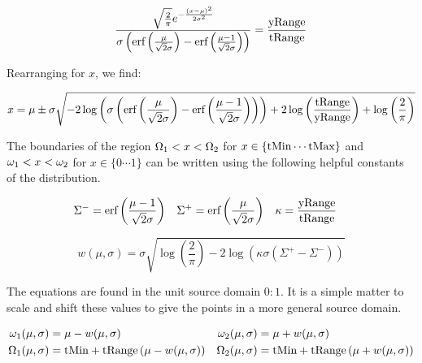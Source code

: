 \begin{equation}\label{eq:Boundaries}
\frac{\sqrt{\frac{2}{\pi }} e^{-\frac{(x-\mu )^2}{2 \sigma ^2}}}{\sigma  \left(\text{erf}\left(\frac{\mu }{\sqrt{2} \sigma }\right)-\text{erf}\left(\frac{\mu -1}{\sqrt{2} \sigma }\right)\right)}=\frac{\text{yRange}}{\text{tRange}}
\end{equation}

Rearranging for $x$, we find:

\begin{equation}\label{eq:PreservedRegion}
 x=\mu \pm \sigma  \sqrt{-2 \log \left(\sigma  \left(\text{erf}\left(\frac{\mu }{\sqrt{2} \sigma }\right)-\text{erf}\left(\frac{\mu -1}{\sqrt{2} \sigma }\right)\right)\right)+2 \log \left(\frac{\text{tRange}}{\text{yRange}}\right)+\log \left(\frac{2}{\pi }\right)}
\end{equation}


The boundaries of the region $\Omega_1 < x < \Omega_2$ for $x \in \{\text{tMin} \cdots \text{tMax} \}$ and $\omega_1 < x < \omega_2$ for $x \in \{0 \cdots 1 \}$ can be written using the following helpful constants of the distribution.

\begin{align}\label{eq:DistributionConstants2}
\Sigma^- &= \text{erf}\left(\frac{\mu -1}{\sqrt{2} \sigma }\right) &
 \Sigma^+ &= \text{erf}\left(\frac{\mu }{\sqrt{2} \sigma }\right) &
  \kappa &= \frac{\text{yRange}}{\text{tRange}} 
\end{align}

\begin{equation}\label{eq:PreservedRegionConsts}
  w(\mu,\sigma)  =  \sigma  \sqrt{ \log \left(\frac{2}{\pi } \right) -2 \log \left(\kappa \sigma  \left(\Sigma^+-\Sigma^-\right)\right) }
\end{equation}

The equations are found in the unit source domain $0:1$. It is a simple matter to scale and shift these values to give the points in a more general source domain.

\begin{equation}\label{eq:PreservedRegionGen}
\begin{aligned}
\omega_1(\mu,\sigma) &=                                    \mu - w(\mu,\sigma) &            \omega_2(\mu,\sigma) &=                                   \mu + w(\mu,\sigma) \\
\Omega_1(\mu,\sigma) &= \text{tMin} + \text{tRange}\left( \mu - w(\mu,\sigma) \right) & \Omega_2(\mu,\sigma) &= \text{tMin} + \text{tRange} \left(\mu + w(\mu,\sigma)\right)
\end{aligned}
\end{equation}

